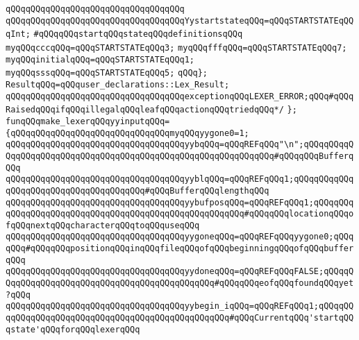 \verb|qQQqqQQqqQQqqQQqqQQqqQQqqQQqqQQqqQQq|\newline
\verb|qQQqqQQqqQQqqQQqqQQqqQQqqQQqqQQqqQQqYystartstateqQQq=qQQqSTARTSTATEqQQqInt;|\newline
\newline
\verb|#qQQqqQQqstartqQQqstateqQQqdefinitionsqQQq|\newline
\newline
\verb|myqQQqcccqQQq=qQQqSTARTSTATEqQQq3;|\newline
\verb|myqQQqfffqQQq=qQQqSTARTSTATEqQQq7;|\newline
\verb|myqQQqinitialqQQq=qQQqSTARTSTATEqQQq1;|\newline
\verb|myqQQqsssqQQq=qQQqSTARTSTATEqQQq5;|\newline
\newline
\verb|qQQq};|\newline
\verb|ResultqQQq=qQQquser_declarations::Lex_Result;|\newline
\verb|qQQqqQQqqQQqqQQqqQQqqQQqqQQqqQQqqQQqexceptionqQQqLEXER_ERROR;qQQq#qQQqRaisedqQQqifqQQqillegalqQQqleafqQQqactionqQQqtriedqQQq*/|\newline
\verb|};|\newline
\newline
\verb|funqQQqmake_lexerqQQqyyinputqQQq=|\newline
\verb|{qQQqqQQqqQQqqQQqqQQqqQQqqQQqqQQqmyqQQqyygone0=1;|\newline
\verb|qQQqqQQqqQQqqQQqqQQqqQQqqQQqqQQqqQQqyybqQQq=qQQqREFqQQq"\n";qQQqqQQqqQQqqQQqqQQqqQQqqQQqqQQqqQQqqQQqqQQqqQQqqQQqqQQqqQQqqQQq#qQQqqQQqBufferqQQq|\newline
\verb|qQQqqQQqqQQqqQQqqQQqqQQqqQQqqQQqqQQqyyblqQQq=qQQqREFqQQq1;qQQqqQQqqQQqqQQqqQQqqQQqqQQqqQQqqQQqqQQq#qQQqBufferqQQqlengthqQQq|\newline
\verb|qQQqqQQqqQQqqQQqqQQqqQQqqQQqqQQqqQQqyybufposqQQq=qQQqREFqQQq1;qQQqqQQqqQQqqQQqqQQqqQQqqQQqqQQqqQQqqQQqqQQqqQQqqQQqqQQq#qQQqqQQqlocationqQQqofqQQqnextqQQqcharacterqQQqtoqQQquseqQQq|\newline
\verb|qQQqqQQqqQQqqQQqqQQqqQQqqQQqqQQqqQQqyygoneqQQq=qQQqREFqQQqyygone0;qQQqqQQq#qQQqqQQqpositionqQQqinqQQqfileqQQqofqQQqbeginningqQQqofqQQqbufferqQQq|\newline
\verb|qQQqqQQqqQQqqQQqqQQqqQQqqQQqqQQqqQQqyydoneqQQq=qQQqREFqQQqFALSE;qQQqqQQqqQQqqQQqqQQqqQQqqQQqqQQqqQQqqQQqqQQqqQQq#qQQqqQQqeofqQQqfoundqQQqyet?qQQq|\newline
\verb|qQQqqQQqqQQqqQQqqQQqqQQqqQQqqQQqqQQqyybegin_iqQQq=qQQqREFqQQq1;qQQqqQQqqQQqqQQqqQQqqQQqqQQqqQQqqQQqqQQqqQQqqQQqqQQq#qQQqCurrentqQQq'startqQQqstate'qQQqforqQQqlexerqQQq|\newline

